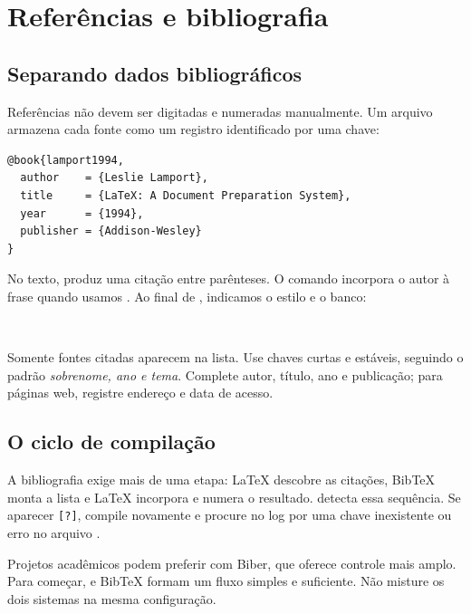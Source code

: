 \chapter{Referências e bibliografia}
\label{chap:referencias}

\section{Separando dados bibliográficos}

Referências não devem ser digitadas e numeradas manualmente. Um arquivo
 armazena cada fonte como um registro identificado por uma chave:

\begin{lstlisting}
@book{lamport1994,
  author    = {Leslie Lamport},
  title     = {LaTeX: A Document Preparation System},
  year      = {1994},
  publisher = {Addison-Wesley}
}
\end{lstlisting}

No texto,  produz uma citação entre parênteses. O comando
 incorpora o autor à frase quando usamos . Ao
final de , indicamos o estilo e o banco:

\begin{lstlisting}[language=LaTeXBook]


\end{lstlisting}

Somente fontes citadas aparecem na lista. Use chaves curtas e estáveis, seguindo
o padrão \emph{sobrenome, ano e tema}. Complete autor, título, ano e publicação;
para páginas web, registre endereço e data de acesso.

\section{O ciclo de compilação}

A bibliografia exige mais de uma etapa: LaTeX descobre as citações, BibTeX monta
a lista e LaTeX incorpora e numera o resultado.  detecta essa
sequência. Se aparecer \verb|[?]|, compile novamente e procure no log por uma
chave inexistente ou erro no arquivo .

Projetos acadêmicos podem preferir  com Biber, que oferece
controle mais amplo. Para começar,  e BibTeX formam um fluxo
simples e suficiente. Não misture os dois sistemas na mesma configuração.

